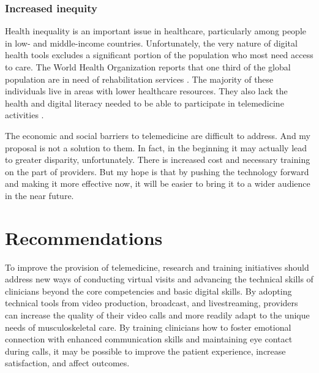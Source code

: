 \documentclass[utf8]{FrontiersinHarvard} %
\begin{document}
\subsubsection{Increased inequity}

Health inequality is an important issue in healthcare, particularly among people in low- and middle-income countries. Unfortunately, the very nature of digital health tools excludes a significant portion of the population who most need access to care. The World Health Organization reports that one third of the global population are in need of rehabilitation services \citep{Gimigliano2017World}. The majority of these individuals live in areas with lower healthcare resources. They also lack the health and digital literacy needed to be able to participate in telemedicine activities \citep{fernandesWhatExtentCan2021}.

The economic and social barriers to telemedicine are difficult to address. And my proposal is not a solution to them. In fact, in the beginning it may actually lead to greater disparity, unfortunately. There is increased cost and necessary training on the part of providers. But my hope is that by pushing the technology forward and making it more effective now, it will be easier to bring it to a wider audience in the near future.

\section{Recommendations}

To improve the provision of telemedicine, research and training initiatives should address new ways of conducting virtual visits and advancing the technical skills of clinicians beyond the core competencies and basic digital skills. By adopting technical tools from video production, broadcast, and livestreaming, providers can increase the quality of their video calls and more readily adapt to the unique needs of musculoskeletal care. By training clinicians how to foster emotional connection with enhanced communication skills and maintaining eye contact during calls, it may be possible to improve the patient experience, increase satisfaction, and affect outcomes.

\end{document}
